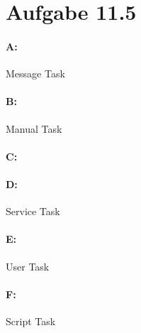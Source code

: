 \documentclass{article}
\begin{document}
	\section*{Aufgabe 11.5}
		\paragraph*{A:}Message Task
		
		\paragraph*{B:}Manual Task
		
		\paragraph*{C:}
		
		\paragraph*{D:}Service Task
		
		\paragraph*{E:}User Task
		
		\paragraph*{F:}Script Task
	
	
\end{document}
